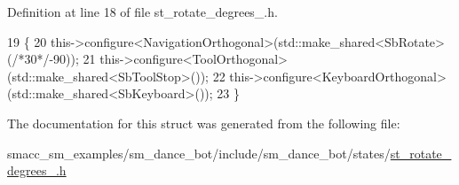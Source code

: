 Definition at line 18 of file st\+\_\+rotate\+\_\+degrees\+\_.\+h.


\begin{DoxyCode}
19   \{
20     this->configure<NavigationOrthogonal>(std::make\_shared<SbRotate>(\textcolor{comment}{/*30*/}-90));
21     this->configure<ToolOrthogonal>(std::make\_shared<SbToolStop>());
22     this->configure<KeyboardOrthogonal>(std::make\_shared<SbKeyboard>());
23   \}
\end{DoxyCode}


The documentation for this struct was generated from the following file\+:\begin{DoxyCompactItemize}
\item 
smacc\+\_\+sm\+\_\+examples/sm\+\_\+dance\+\_\+bot/include/sm\+\_\+dance\+\_\+bot/states/\hyperlink{st__rotate__degrees__2_8h}{st\+\_\+rotate\+\_\+degrees\+\_.\+h}\end{DoxyCompactItemize}
